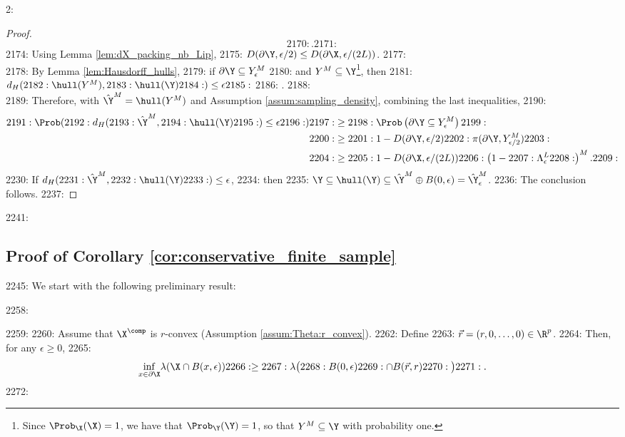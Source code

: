 2: \documentclass[12pt]{l4dc2022} %
\begin{document}
\begin{proof}
$$2170: .
2171: $$
2174: Using Lemma \ref{lem:dX_packing_nb_Lip},  
2175: $D(\partial\Y,\epsilon/2)\leq D(\partial\X,\epsilon/(2L))$. 
2177: \\
2178: By Lemma \ref{lem:Hausdorff_hulls}, 
2179:  if $\partial\Y\subseteq Y_\epsilon^M$
2180: and $Y^M\subseteq\Y$\footnote{Since $\Prob_\X(\X)=1$, we have that $\Prob_\Y(\Y)=1$, so that $Y^M\subseteq\Y$ with probability one.}, then 
2181: $d_H(
2182: \hull(Y^M), 
2183: \hull(\Y)
2184: )\leq \epsilon
2185: $  
2186: .
2188: \\
2189: Therefore, with $\hat\Y^M=\hull(Y^M)$ and Assumption \ref{assum:sampling_density}, combining the last inequalities,
2190: \begin{align*}
2191: \Prob(
2192: d_H(
2193: \hat\Y^M, 
2194: \hull(\Y)
2195: )\leq \epsilon
2196: )
2197: &\geq 
2198: \Prob\left(\partial\Y\subseteq Y_\epsilon^M\right)
2199: \\
2200: &\geq 
2201: 1 - D(\partial\Y,\epsilon/2)
2202: \pi(\partial\Y,Y_{\epsilon/2}^M)
2203: \\
2204: &\geq
2205: 1 - D(\partial\X,\epsilon/(2L))
2206: \left(1 -
2207: 	\Lambda_{\epsilon}^{L}
2208: \right)^M.
2209: \end{align*}
2230: If $d_H(
2231: \hat\Y^M, 
2232: \hull(\Y)
2233: )\leq \epsilon$, 
2234: then 
2235: $\Y\subseteq\hull(\Y)\subseteq \hat\Y^M\oplus B(0,\epsilon)=\hat\Y_\epsilon^M$. 
2236: The conclusion follows.
2237: \end{proof}

2241: \subsection{Proof of Corollary \ref{cor:conservative_finite_sample}}\label{apdx:proof:cor:conservative_finite_sample}

2245: We start with the following preliminary result:

2258: \begin{lemma}%
2259: \label{lem:X_vol_covrg_eps_ball:improved_caps}
2260: Assume that $\X^\comp$ is $r$-convex  (Assumption \ref{assum:Theta:r_convex}).
2262: Define 
2263: $\vec{r}=(r,0,\dots,0)\in\R^p$. 
2264: Then, for any $\epsilon\geq 0$,  
2265: $$\underset{x\in\partial\X}{\inf}\lambda(\X \cap B(x,\epsilon))
2266: \geq 
2267: \lambda\big(
2268: B(0,\epsilon) 
2269: \cap B(\vec{r},r)
2270: \big)
2271: .$$
2272: \end{lemma}
\end{document}
